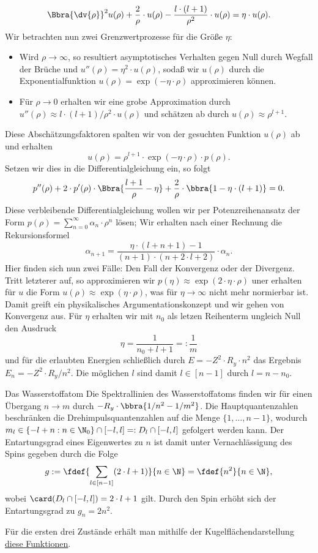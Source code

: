 \documentclass{subfiles}
\begin{document}
        \[
            \Bbra{\dv{\rho}}^2 u(\rho) + \frac{2}{\rho}\cdot u(\rho) - \frac{l\cdot(l+1)}{\rho^2}\cdot u(\rho) = \eta\cdot u(\rho).
        \]
        Wir betrachten nun zwei Grenzwertprozesse für die Größe $\eta$:
        \begin{itemize}
            \item Wird $\rho \to \infty$, so resultiert asymptotisches Verhalten gegen Null durch Wegfall der Brüche und $u''(\rho) = \eta^2\cdot u(\rho)$, sodaß wir $u(\rho)$ durch die Exponentialfunktion $u(\rho) = \exp(-\eta\cdot\rho)$ approximieren können.
            \item Für $\rho\to 0$ erhalten wir eine grobe Approximation durch $u''(\rho) \approx l\cdot (l+1)/\rho^2\cdot u(\rho)$ und schätzen ab durch $u(\rho) \approx \rho^{l + 1}$. 
        \end{itemize}
        Diese Abschätzungsfaktoren spalten wir von der gesuchten Funktion $u(\rho)$ ab und erhalten 
        \[
            u(\rho) = \rho^{l+1}\cdot\exp(-\eta\cdot\rho)\cdot p(\rho).
        \] 
        Setzen wir dies in die Differentialgleichung ein, so folgt
        \[
            p''(\rho) + 2\cdot p'(\rho)\cdot\Bbra{\frac{l+1}{\rho} - \eta} + \frac{2}{\rho}\cdot \bbra{1 - \eta\cdot (l + 1)} = 0.
        \]
        Diese verbleibende Differentialgleichung wollen wir per Potenzreihenansatz der Form $p(\rho) = \sum_{n = 0}^\infty\alpha_n\cdot\rho^n$ lösen; Wir erhalten nach einer Rechnung die Rekursionsformel
        \[
            \alpha_{n + 1} = \frac{\eta\cdot (l + n + 1) - 1}{(n + 1)\cdot (n + 2\cdot l + 2)}\cdot\alpha_n.
        \]
        Hier finden sich nun zwei Fälle: Den Fall der Konvergenz oder der Divergenz. Tritt letzterer auf, so approximieren wir $p(\eta)\approx \exp(2\cdot \eta\cdot\rho)$ uner erhalten für $u$ die Form $u(\rho) \approx \exp(\eta\cdot\rho)$, was für $\eta\to\infty$ nicht mehr normierbar ist. Damit greift ein physikalisches Argumentationskonzept und wir gehen von Konvergenz aus. Für $\eta$ erhalten wir mit $n_0$ als letzen Reihenterm ungleich Null den Ausdruck
        \[
            \eta = \frac{1}{n_0 + l + 1}=: \frac{1}{m}
        \]
        und für die erlaubten Energien schließlich durch $E = -Z^2\cdot R_y\cdot n^2$ das Ergebnis $E_n = -Z^2\cdot R_y / n^2$. Die möglichen $l$ sind damit $l\in[n - 1]$ durch $l = n - n_0$. 
        \begin{mcor}{Das Wasserstoffatom}
            Die Spektrallinien des Wasserstoffatoms finden wir für einen Übergang $n\to m$ durch $-R_y\cdot \bbra{1/n^2 - 1/m^2}$. Die Hauptquantenzahlen beschränken die Drehimpulsquantenzahlen auf die Menge $\{1,\dots,n-1\}$, wodurch $m_l\in\{-l + n:n\in\N_0\}\cap[-l,l] =: D_l\cap [-l,l]$ gefolgert werden kann. Der Entartungsgrad eines Eigenwertes zu $n$ ist damit unter Vernachlässigung des Spins gegeben durch die Folge
            \[
                g:=\fdef{\sum_{l \in [n-1]}(2\cdot l + 1)}{n\in\N} = \fdef{n^2}{n\in\N},
            \]
            wobei $\card(D_l\cap[-l,l]) = 2\cdot l + 1$ gilt. Durch den Spin erhöht sich der Entartungsgrad zu $g_n = 2n^2$. 
        \end{mcor}
        Für die ersten drei Zustände erhält man mithilfe der Kugelflächendarstellung \href{https://de.wikipedia.org/wiki/Wasserstoffatom}{diese Funktionen}. 
\end{document}
